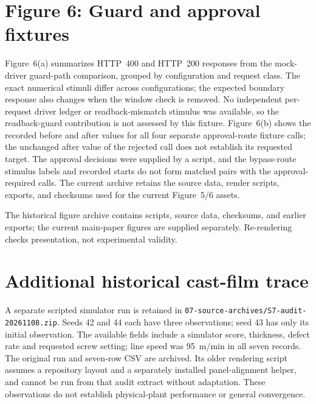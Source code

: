 \documentclass[10pt]{article}
\begin{document}
\section*{Figure 6: Guard and approval fixtures}
Figure~6(a) summarizes HTTP~400 and HTTP~200 responses from the mock-driver guard-path comparison, grouped by configuration and request class. The exact numerical stimuli differ across configurations; the expected boundary response also changes when the window check is removed. No independent per-request driver ledger or readback-mismatch stimulus was available, so the readback-guard contribution is not assessed by this fixture. Figure~6(b) shows the recorded before and after values for all four separate approval-route fixture calls; the unchanged after value of the rejected call does not establish its requested target. The approval decisions were supplied by a script, and the bypass-route stimulus labels and recorded starts do not form matched pairs with the approval-required calls. The current archive retains the source data, render scripts, exports, and checksums used for the current Figure~5/6 assets.

The historical figure archive contains scripts, source data, checksums, and earlier exports; the current main-paper figures are supplied separately. Re-rendering checks presentation, not experimental validity.

\section*{Additional historical cast-film trace}
A separate scripted simulator run is retained in \texttt{07-source-archives/S7-audit-20261108.zip}. Seeds 42 and 44 each have three observations; seed 43 has only its initial observation. The available fields include a simulator score, thickness, defect rate and requested screw setting; line speed was 95~m/min in all seven records. The original run and seven-row CSV are archived. Its older rendering script assumes a repository layout and a separately installed panel-alignment helper, and cannot be run from that audit extract without adaptation. These observations do not establish physical-plant performance or general convergence.
\end{document}
